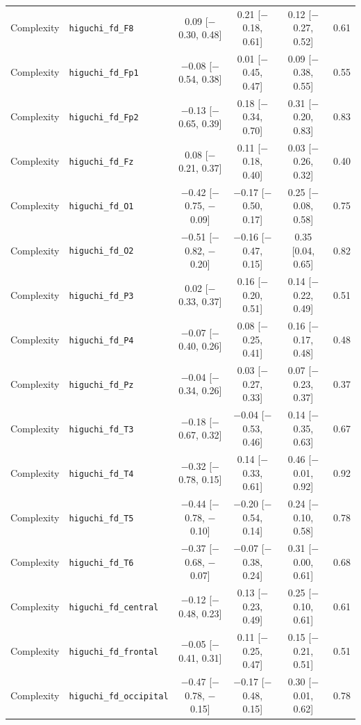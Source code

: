{\begin{longtable}{llcccc}
Complexity & \texttt{higuchi\_fd\_F8} & 0.09 [$-$0.30, 0.48] & 0.21 [$-$0.18, 0.61] & 0.12 [$-$0.27, 0.52] & 0.61 \\
Complexity & \texttt{higuchi\_fd\_Fp1} & $-$0.08 [$-$0.54, 0.38] & 0.01 [$-$0.45, 0.47] & 0.09 [$-$0.38, 0.55] & 0.55 \\
Complexity & \texttt{higuchi\_fd\_Fp2} & $-$0.13 [$-$0.65, 0.39] & 0.18 [$-$0.34, 0.70] & 0.31 [$-$0.20, 0.83] & 0.83 \\
Complexity & \texttt{higuchi\_fd\_Fz} & 0.08 [$-$0.21, 0.37] & 0.11 [$-$0.18, 0.40] & 0.03 [$-$0.26, 0.32] & 0.40 \\
Complexity & \texttt{higuchi\_fd\_O1} & $-$0.42 [$-$0.75, $-$0.09] & $-$0.17 [$-$0.50, 0.17] & 0.25 [$-$0.08, 0.58] & 0.75 \\
Complexity & \texttt{higuchi\_fd\_O2} & $-$0.51 [$-$0.82, $-$0.20] & $-$0.16 [$-$0.47, 0.15] & 0.35 [0.04, 0.65] & 0.82 \\
Complexity & \texttt{higuchi\_fd\_P3} & 0.02 [$-$0.33, 0.37] & 0.16 [$-$0.20, 0.51] & 0.14 [$-$0.22, 0.49] & 0.51 \\
Complexity & \texttt{higuchi\_fd\_P4} & $-$0.07 [$-$0.40, 0.26] & 0.08 [$-$0.25, 0.41] & 0.16 [$-$0.17, 0.48] & 0.48 \\
Complexity & \texttt{higuchi\_fd\_Pz} & $-$0.04 [$-$0.34, 0.26] & 0.03 [$-$0.27, 0.33] & 0.07 [$-$0.23, 0.37] & 0.37 \\
Complexity & \texttt{higuchi\_fd\_T3} & $-$0.18 [$-$0.67, 0.32] & $-$0.04 [$-$0.53, 0.46] & 0.14 [$-$0.35, 0.63] & 0.67 \\
Complexity & \texttt{higuchi\_fd\_T4} & $-$0.32 [$-$0.78, 0.15] & 0.14 [$-$0.33, 0.61] & 0.46 [$-$0.01, 0.92] & 0.92 \\
Complexity & \texttt{higuchi\_fd\_T5} & $-$0.44 [$-$0.78, $-$0.10] & $-$0.20 [$-$0.54, 0.14] & 0.24 [$-$0.10, 0.58] & 0.78 \\
Complexity & \texttt{higuchi\_fd\_T6} & $-$0.37 [$-$0.68, $-$0.07] & $-$0.07 [$-$0.38, 0.24] & 0.31 [$-$0.00, 0.61] & 0.68 \\
Complexity & \texttt{higuchi\_fd\_central} & $-$0.12 [$-$0.48, 0.23] & 0.13 [$-$0.23, 0.49] & 0.25 [$-$0.10, 0.61] & 0.61 \\
Complexity & \texttt{higuchi\_fd\_frontal} & $-$0.05 [$-$0.41, 0.31] & 0.11 [$-$0.25, 0.47] & 0.15 [$-$0.21, 0.51] & 0.51 \\
Complexity & \texttt{higuchi\_fd\_occipital} & $-$0.47 [$-$0.78, $-$0.15] & $-$0.17 [$-$0.48, 0.15] & 0.30 [$-$0.01, 0.62] & 0.78 \\

\end{longtable}}
